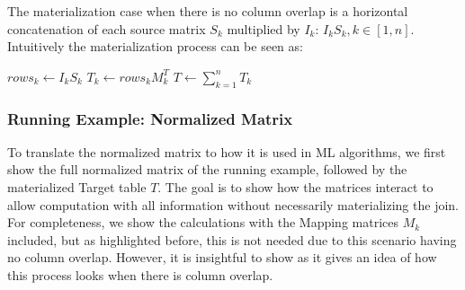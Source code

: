 The materialization case when there is no column overlap is a horizontal concatenation of each source matrix $S_k$ multiplied by $I_k$: $I_k S_k, k \in [1,n]$. Intuitively the materialization process can be seen as:
\begin{algorithmic}
   
  \State $rows_k \gets I_k S_k$ 
  \State $T_k \gets rows_k M^T_k$ 
  \EndFor
  \State $T \gets \sum_{k=1}^{n} T_k$ 
\end{algorithmic}

\subsubsection{Running Example: Normalized Matrix}
\label{subsubsec:2-fac-ml-example}
To translate the normalized matrix to how it is used in ML algorithms, we first show the full normalized matrix of the running example, followed by the materialized Target table $T$. The goal is to show how the matrices interact to allow computation with all information without necessarily materializing the join. For completeness, we show the calculations with the Mapping matrices $M_k$ included, but as highlighted before, this is not needed due to this scenario having no column overlap. However, it is insightful to show as it gives an idea of how this process looks when there is column overlap.
